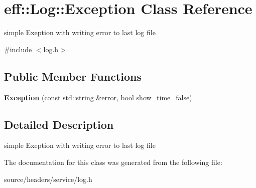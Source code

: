 \hypertarget{classeff_1_1Log_1_1Exception}{}\section{eff\+:\+:Log\+:\+:Exception Class Reference}
\label{classeff_1_1Log_1_1Exception}


simple Exeption with writing error to last log file  




{\ttfamily \#include $<$log.\+h$>$}

\subsection*{Public Member Functions}
\begin{DoxyCompactItemize}
\item 
\mbox{\label{classeff_1_1Log_1_1Exception_a088fd00b9cf03586808e4ef91bd64b9f}} 
{\bfseries Exception} (const std\+::string \&error, bool show\+\_\+time=false)
\end{DoxyCompactItemize}


\subsection{Detailed Description}
simple Exeption with writing error to last log file 

The documentation for this class was generated from the following file\+:\begin{DoxyCompactItemize}
\item 
source/headers/service/log.\+h\end{DoxyCompactItemize}
